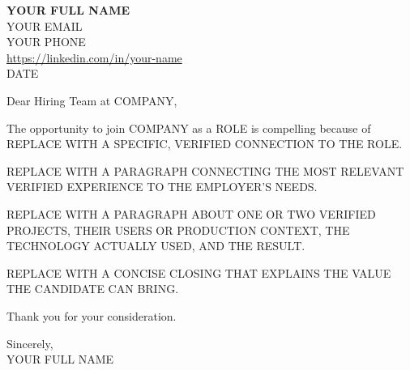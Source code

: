 \documentclass[letterpaper,11pt]{article}
\newcommand{\CandidateName}{YOUR FULL NAME}
\newcommand{\CandidateEmail}{YOUR EMAIL}
\newcommand{\CandidatePhone}{YOUR PHONE}
\newcommand{\CandidateLinkedIn}{https://linkedin.com/in/your-name}
\newcommand{\LetterDate}{DATE}
\newcommand{\CompanyName}{COMPANY}
\newcommand{\RoleTitle}{ROLE}
\begin{document}
{\Large\textbf{\CandidateName}}\\
\CandidateEmail\\
\CandidatePhone\\
\href{\CandidateLinkedIn}{\CandidateLinkedIn}\\
\LetterDate

\vspace{1em}

Dear Hiring Team at \CompanyName,

The opportunity to join \CompanyName{} as a \RoleTitle{} is compelling because
of REPLACE WITH A SPECIFIC, VERIFIED CONNECTION TO THE ROLE.

REPLACE WITH A PARAGRAPH CONNECTING THE MOST RELEVANT VERIFIED EXPERIENCE TO
THE EMPLOYER'S NEEDS.

REPLACE WITH A PARAGRAPH ABOUT ONE OR TWO VERIFIED PROJECTS, THEIR USERS OR
PRODUCTION CONTEXT, THE TECHNOLOGY ACTUALLY USED, AND THE RESULT.

REPLACE WITH A CONCISE CLOSING THAT EXPLAINS THE VALUE THE CANDIDATE CAN BRING.

Thank you for your consideration.

Sincerely,\\
\CandidateName
\end{document}
